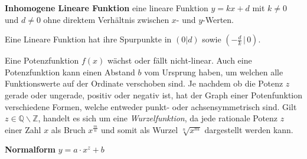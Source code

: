 \textbf{Inhomogene Lineare Funktion}  eine lineare Funktion $y = kx + d$ mit $k \neq 0$ und $d \neq 0$ ohne direktem Verh\"{a}ltnis zwischen $x$- und $y$-Werten.

Eine Lineare Funktion hat ihre Spurpunkte in $(0|d)$ sowie $\left(-\frac{d}{k} \, | \, 0\right)$.

\begin{figure}[h!]
\centering
\end{figure}


\pagebreak


Eine Potenzfunktion $f(x)$ w\"{a}chst oder f\"{a}llt nicht-linear. Auch eine Potenzfunktion kann einen Abstand $b$ vom Ursprung haben, um welchen alle Funktionswerte auf der Ordinate verschoben sind. Je nachdem ob die Potenz $z$ gerade oder ungerade, positiv oder negativ ist, hat der Graph einer Potenfunktion verschiedene Formen, welche entweder punkt- oder achsensymmetrisch sind. Gilt $z \in \mathbb{Q} \backslash \mathbb{Z}$, handelt es sich um eine \emph{Wurzelfunktion}, da jede rationale Potenz $z$ einer Zahl $x$ als Bruch $x^{\frac{m}{n}}$ und somit als Wurzel $\sqrt[n]{x^m}$ dargestellt werden kann.

\textbf{Normalform}  $y = a \cdot x^z + b$

\extrapar

